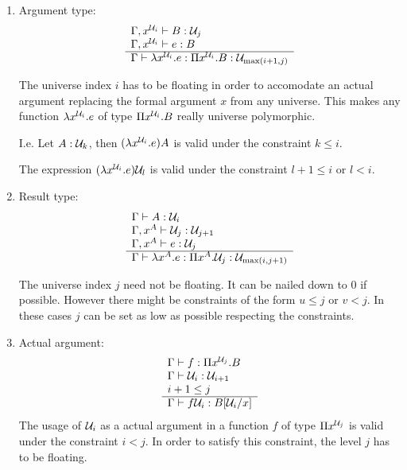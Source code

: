 \begin{enumerate}

    \item Argument type:
        $$
        \begin{array}{l} 
            \Gamma, x^{{\cal U}_i} \vdash B: {\cal U}_j
            \\
            \Gamma, x^{{\cal U}_i} \vdash e: B
         \\ \hline 
            \Gamma \vdash \lambda x^{{\cal U}_i}. e
            : \Pi x^{{\cal U}_i}. B
            : {\cal U}_{\text{max}(i+1, j)}
         \end{array}
        $$

        The universe index $i$ has to be floating in order to accomodate an
        actual argument replacing the formal argument $x$ from any universe.
        This makes any function $\lambda x^{{\cal U}_i}. e$ of type $\Pi x^{{\cal U}_i}.
        B$ really universe polymorphic.

        I.e. Let $A: {\cal U}_k$, then $(\lambda x^{{\cal U}_i}. e) A$ is valid under the
        constraint $k \le i$.

        The expression $(\lambda x^{{\cal U}_i}. e) {\cal U}_l$ is valid under the
        constraint $l+1 \le i$ or $l < i$.


    \item Result type:
        $$
        \begin{array}{l} 
            \Gamma \vdash A: {\cal U}_i
            \\
            \Gamma, x^A \vdash {\cal U}_j : {\cal U}_{j+1}
            \\
            \Gamma, x^A \vdash e: {\cal U}_j
         \\ \hline 
            \Gamma \vdash \lambda x^A. e
            : \Pi x^A. {\cal U}_j
            : {\cal U}_{\text{max}(i, j+1)}
         \end{array}
        $$

        The universe index $j$ need not be floating. It can be nailed down to
        $0$ if possible. However there might be constraints of the form $u \le
        j$ or $v < j$. In these cases $j$ can be set as low as possible
        respecting the constraints.

    \item Actual argument:
        $$
        \begin{array}{l} 
            \Gamma \vdash f : \Pi x^{{\cal U}_j}. B
            \\
            \Gamma \vdash {\cal U}_i : {\cal U}_{i+1}
            \\
            i+1 \le j
         \\ \hline 
            \Gamma \vdash f {\cal U}_i: B[{\cal U}_i / x]
         \end{array}
        $$
        The usage of ${\cal U}_i$ as a actual argument in a function $f$ of type
        $\Pi x^{{\cal U}_j}$ is valid under the constraint $i < j$. In order to
        satisfy this constraint, the level $j$ has to be floating.


\end{enumerate}
